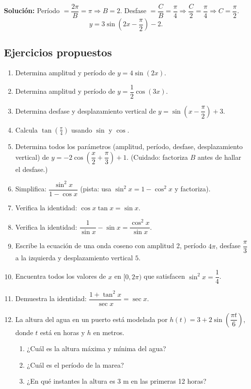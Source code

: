 \documentclass[12pt, a4paper]{article}
\begin{document}
\begin{cuadrosolucion}
  \textbf{Solución:} Período $= \dfrac{2\pi}{B} = \pi \Rightarrow B = 2$. Desfase $= \dfrac{C}{B} = \dfrac{\pi}{4} \Rightarrow \dfrac{C}{2} = \dfrac{\pi}{4} \Rightarrow C = \dfrac{\pi}{2}$.
  $$y = 3\sin\left(2x - \frac{\pi}{2}\right) - 2.$$
\end{cuadrosolucion}

\newpage

\subsection{Ejercicios propuestos}

\begin{enumerate}[leftmargin=*, resume]
  \item \facil{} Determina amplitud y período de $y = 4\sin(2x)$.
  \item \facil{} Determina amplitud y período de $y = \dfrac{1}{2}\cos(3x)$.
  \item \facil{} Determina desfase y desplazamiento vertical de $y = \sin\left(x - \dfrac{\pi}{2}\right) + 3$.
  \item \facil{} Calcula $\tan\left(\frac{\pi}{4}\right)$ usando $\sin$ y $\cos$.
  \item \medio{} Determina todos los parámetros (amplitud, período, desfase, desplazamiento vertical) de $y = -2\cos\left(\dfrac{x}{2} + \dfrac{\pi}{3}\right) + 1$. (Cuidado: factoriza $B$ antes de hallar el desfase.)
  \item \medio{} Simplifica: $\dfrac{\sin^2 x}{1 - \cos x}$ (pista: usa $\sin^2 x = 1 - \cos^2 x$ y factoriza).
  \item \medio{} Verifica la identidad: $\cos x \tan x = \sin x$.
  \item \medio{} Verifica la identidad: $\dfrac{1}{\sin x} - \sin x = \dfrac{\cos^2 x}{\sin x}$.
  \item \dificil{} Escribe la ecuación de una onda coseno con amplitud 2, período $4\pi$, desfase $\dfrac{\pi}{3}$ a la izquierda y desplazamiento vertical $5$.
  \item \dificil{} Encuentra todos los valores de $x$ en $[0, 2\pi)$ que satisfacen $\sin^2 x = \dfrac{1}{4}$.
  \item \dificil{} Demuestra la identidad: $\dfrac{1 + \tan^2 x}{\sec x} = \sec x$.
  \item \dificil{} La altura del agua en un puerto está modelada por $h(t) = 3 + 2\sin\left(\dfrac{\pi t}{6}\right)$, donde $t$ está en horas y $h$ en metros.
        \begin{enumerate}[label=\alph*)]
          \item ¿Cuál es la altura máxima y mínima del agua?
          \item ¿Cuál es el período de la marea?
          \item ¿En qué instantes la altura es $3$ m en las primeras 12 horas?
        \end{enumerate}
\end{enumerate}
\end{document}
